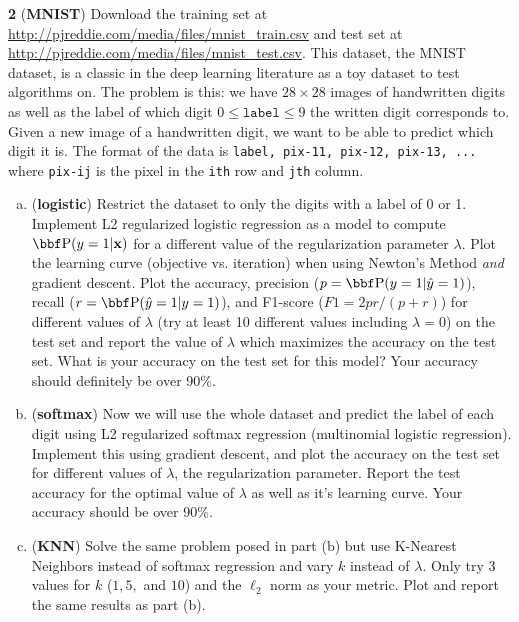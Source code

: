 \documentclass[12pt,letterpaper,fleqn]{hmcpset}
\begin{document}
\textbf{2} (\textbf{MNIST}) Download the training set at 
\url{http://pjreddie.com/media/files/mnist_train.csv} and test set at
\url{http://pjreddie.com/media/files/mnist_test.csv}. This dataset, the MNIST
dataset, is a classic in the deep learning literature as a toy dataset to test
algorithms on. The problem is this: we have $28\times 28$ images of handwritten
digits as well as the label of which digit $0 \leq \texttt{label} \leq 9$ the written
digit corresponds to. Given a new image of a handwritten digit, we want to be
able to predict which digit it is.
The format of the data is \texttt{label, pix-11, pix-12, pix-13, ...}
where \texttt{pix-ij} is the pixel in the \texttt{ith} row and \texttt{jth} column.
\begin{enumerate}[(a)]
    \item (\textbf{logistic}) Restrict the dataset to only the digits with a label
        of 0 or 1. Implement L2 regularized logistic regression as a model to compute
        $\PP(y=1|\xx)$ for a different value of the regularization parameter $\lambda$.
        Plot the learning curve (objective vs. iteration) when using Newton's Method
        \textit{and} gradient descent.
        Plot the accuracy, precision ($p = \PP(y=1 | \hat y=1)$), recall ($r = \PP(\hat y=1 | y=1)$),
        and F1-score ($F1 = 2pr / (p+r)$) for different values of $\lambda$ (try at least
        10 different values including $\lambda = 0$) on the test set and report the
        value of $\lambda$ which maximizes the accuracy on the test set. What is your
        accuracy on the test set for this model? Your accuracy should definitely be
        over 90\%.

    \item (\textbf{softmax}) Now we will use the whole dataset and predict the label
        of each digit using L2 regularized softmax regression (multinomial logistic
        regression). Implement this using gradient descent, and plot the accuracy
        on the test set for different values of $\lambda$, the regularization parameter.
        Report the test accuracy for the optimal value of $\lambda$ as well as it's
        learning curve. Your accuracy should be over 90\%.

    \item (\textbf{KNN}) Solve the same problem posed in part (b) but use
        K-Nearest Neighbors instead of softmax regression and vary $k$ instead
        of $\lambda$. Only try 3 values for $k$ ($1,5,$ and $10$) and the $\ell_2$
        norm as your metric. Plot and report the same results as part (b).
\end{enumerate}
\end{document}
